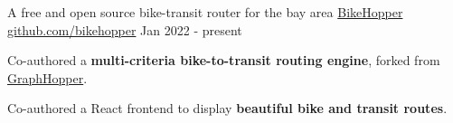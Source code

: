 
\begin{cventries}
  \cventry
    {A free and open source bike-transit router for the bay area} %
    { \href{https://bikehopper.org}{BikeHopper} }
    { \href{https://github.com/bikehopper}{github.com/bikehopper} } %
    {Jan 2022 - present}
    {
      \begin{cvitems}
        \item {Co-authored a \textbf{multi-criteria bike-to-transit routing engine}, forked from \href{https://graphhopper.com}{GraphHopper}.}
        \item {Co-authored a React frontend to display \textbf{beautiful bike and transit routes}.}
      \end{cvitems}
    }
\end{cventries}
